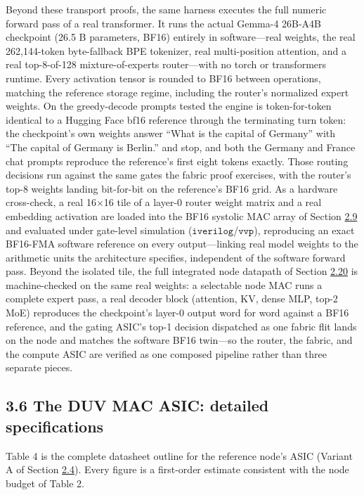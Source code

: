 \documentclass[12pt,onecolumn]{article}
\begin{document}
Beyond these transport proofs, the same harness executes the full numeric forward pass of a real transformer. It runs the actual Gemma-4 26B-A4B checkpoint (26.5 B parameters, BF16) entirely in software---real weights, the real 262{,}144-token byte-fallback BPE tokenizer, real multi-position attention, and a real top-8-of-128 mixture-of-experts router---with no torch or transformers runtime. Every activation tensor is rounded to BF16 between operations, matching the reference storage regime, including the router's normalized expert weights. On the greedy-decode prompts tested the engine is token-for-token identical to a Hugging Face bf16 reference through the terminating turn token: the checkpoint's own weights answer ``What is the capital of Germany'' with ``The capital of Germany is Berlin.'' and stop, and both the Germany and France chat prompts reproduce the reference's first eight tokens exactly. Those routing decisions run against the same gates the fabric proof exercises, with the router's top-8 weights landing bit-for-bit on the reference's BF16 grid. As a hardware cross-check, a real 16$\times$16 tile of a layer-0 router weight matrix and a real embedding activation are loaded into the BF16 systolic MAC array of Section \hyperref[sec:2.9]{2.9} and evaluated under gate-level simulation ($\texttt{iverilog}$/$\texttt{vvp}$), reproducing an exact BF16-FMA software reference on every output---linking real model weights to the arithmetic units the architecture specifies, independent of the software forward pass. Beyond the isolated tile, the full integrated node datapath of Section \hyperref[sec:2.20]{2.20} is machine-checked on the same real weights: a selectable node MAC runs a complete expert pass, a real decoder block (attention, KV, dense MLP, top-2 MoE) reproduces the checkpoint's layer-0 output word for word against a BF16 reference, and the gating ASIC's top-1 decision dispatched as one fabric flit lands on the node and matches the software BF16 twin---so the router, the fabric, and the compute ASIC are verified as one composed pipeline rather than three separate pieces.

\subsection*{3.6 The DUV MAC ASIC: detailed specifications}\label{sec:3.6}

Table 4 is the complete datasheet outline for the reference node's ASIC (Variant A of Section \hyperref[sec:2.4]{2.4}). Every figure is a first-order estimate consistent with the node budget of Table 2.
\end{document}
